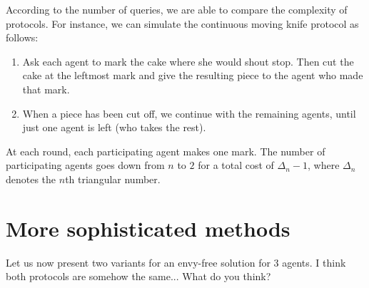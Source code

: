 According to the number of queries, we are able to compare the complexity of protocols.
For instance, we can simulate the continuous moving knife protocol as follows:

\begin{enumerate}
\item
Ask each agent to mark the cake where she would shout stop.
Then cut the cake at the leftmost mark and give the resulting piece to the agent who made that mark.
\item
When a piece has been cut off, we continue with the remaining agents, until just one agent is left (who takes the rest).
\end{enumerate}

At each round, each participating agent makes one mark. 
The number of participating agents goes down from $n$ to $2$ for a total cost of $\Delta_n -1$, 
where $\Delta_n$ denotes the $n$th triangular number. 





\section{More sophisticated methods}

Let us now present two variants for an envy-free solution for $3$ agents.
{\Denis I think both protocols are somehow the same... What do you think?}

